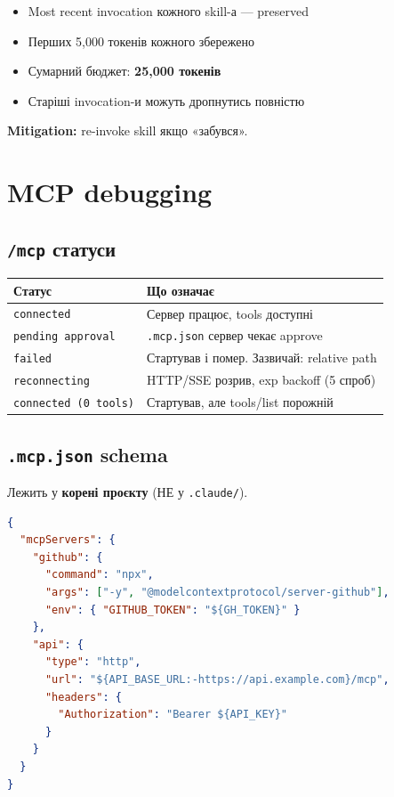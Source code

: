 \documentclass[11pt,a4paper]{article}
\begin{document}
\begin{itemize}
\item Most recent invocation кожного skill-а --- preserved
\item Перших 5,000 токенів кожного збережено
\item Сумарний бюджет: \textbf{25,000 токенів}
\item Старіші invocation-и можуть дропнутись повністю
\end{itemize}

\textbf{Mitigation:} re-invoke skill якщо «забувся».

\section{MCP debugging}

\subsection{\texttt{/mcp} статуси}

\begin{tabular}{ll}
\hline
\textbf{Статус} & \textbf{Що означає} \\
\hline
\texttt{connected} & Сервер працює, tools доступні \\
\texttt{pending approval} & \texttt{.mcp.json} сервер чекає approve \\
\texttt{failed} & Стартував і помер. Зазвичай: relative path \\
\texttt{reconnecting} & HTTP/SSE розрив, exp backoff (5 спроб) \\
\texttt{connected (0 tools)} & Стартував, але tools/list порожній \\
\hline
\end{tabular}

\subsection{\texttt{.mcp.json} schema}

Лежить у \textbf{корені проєкту} (НЕ у \texttt{.claude/}).

\begin{lstlisting}[language=json]
{
  "mcpServers": {
    "github": {
      "command": "npx",
      "args": ["-y", "@modelcontextprotocol/server-github"],
      "env": { "GITHUB_TOKEN": "${GH_TOKEN}" }
    },
    "api": {
      "type": "http",
      "url": "${API_BASE_URL:-https://api.example.com}/mcp",
      "headers": {
        "Authorization": "Bearer ${API_KEY}"
      }
    }
  }
}
\end{lstlisting}
\end{document}
